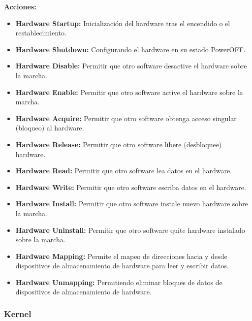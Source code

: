 \documentclass[12pt, twoside, openright]{report} %
\begin{document}
\textbf{Acciones:}
\begin{itemize}
	\item \textbf{Hardware Startup:} Inicialización del hardware tras el encendido o el restablecimiento.
	\item \textbf{Hardware Shutdown:} Configurando el hardware en su estado PowerOFF.
	\item \textbf{Hardware Disable:} Permitir que otro software desactive el hardware sobre la marcha.
	\item \textbf{Hardware Enable:} Permitir que otro software active el hardware sobre la marcha.
	\item \textbf{Hardware Acquire:} Permitir que otro software obtenga acceso singular (bloqueo) al hardware.
	\item \textbf{Hardware Release:} Permitir que otro software libere (desbloquee) hardware.
	\item \textbf{Hardware Read:} Permitir que otro software lea datos en el hardware.
	\item \textbf{Hardware Write:} Permitir que otro software escriba datos en el hardware.
	\item \textbf{Hardware Install:} Permitir que otro software instale nuevo hardware sobre la marcha.
	\item \textbf{Hardware Uninstall:} Permitir que otro software quite hardware instalado sobre la marcha.
	\item \textbf{Hardware Mapping:} Permite el mapeo de direcciones hacia y desde dispositivos de almacenamiento de hardware para leer y escribir datos.
	\item \textbf{Hardware Unmapping:} Permitiendo eliminar bloques de datos de dispositivos de almacenamiento de hardware.
\end{itemize}

\subsubsection{Kernel}
\end{document}
